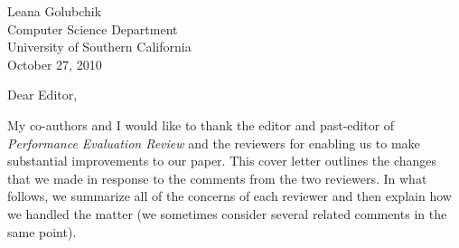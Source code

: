 \documentclass[11pt]{article}
\def\widow#1{\vskip #1\vbadness10000\penalty-200\vskip-#1}
\def\par{\leavevmode\endgraf}
\let\par=\endgraf
\begin{document}

\newtheorem{assume}{Assumption}

\newtheorem{consider}{Consideration}



\theoremstyle{definition}
\newtheorem{definition}{Definition}

\theoremstyle{definition}
\newtheorem{problem}{Problem}

\theoremstyle{definition}
\newtheorem{principle}{Principle}

\def\widow#1{\vskip #1\vbadness10000\penalty-200\vskip-#1}


\makeatletter

\def\maketitle{%
  \thispagestyle{empty}%
  \begin{center}%
    {\Huge \@title\par}%
    {\normalsize \@author\par}%
    \vskip .4in
  \end{center}%

  }

\makeatother

Leana Golubchik \\
Computer Science Department \\
University of Southern California \\
October 27, 2010

\noindent
Dear Editor,

My co-authors and I would like to thank the editor and past-editor of
{\em Performance Evaluation Review} and the reviewers for enabling us
to make substantial improvements to our paper.  This cover letter
outlines the changes that we made in response to the comments from the
two reviewers.  In what follows, we summarize all of the concerns of
each reviewer and then explain how we handled the matter (we sometimes
consider several related comments in the same point).
\end{document}
